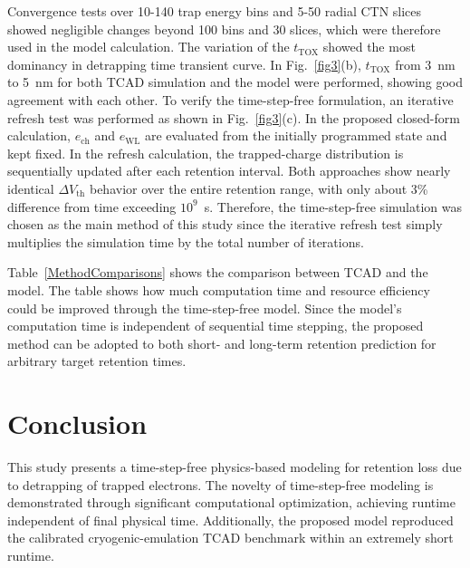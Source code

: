 \documentclass[journal,twoside,web]{ieeecolor}
\begin{document}
{Convergence tests over 10-140 trap energy bins and 5-50 radial CTN slices showed negligible changes beyond 100 bins and 30 slices, which were therefore used in the model calculation.}
The variation of the $t_\text{TOX}$ showed the most dominancy in detrapping time transient curve.
In Fig.~\ref{fig3}(b), $t_\text{TOX}$ from 3~nm to 5~nm for both TCAD simulation and the model were performed, showing good {agreement} with each other.
{To verify the time-step-free formulation, an iterative refresh test was performed as shown in Fig.~\hbox{\ref{fig3}(c)}.}
{In the proposed closed-form calculation, $e_\mathrm{ch}$ and $e_\mathrm{WL}$ are evaluated from the initially programmed state and kept fixed.}
{In the refresh calculation, the trapped-charge distribution is sequentially updated after each retention interval.}
{Both approaches show nearly identical $\Delta V_\text{th}$ behavior over the entire retention range, with only about 3\% difference from time exceeding $10^9$~s.}
{Therefore, the time-step-free simulation was chosen as the main method of this study since the iterative refresh test simply multiplies the simulation time by the total number of iterations.}

Table~\ref{MethodComparisons} shows the comparison between TCAD and the model.
The table shows how much computation time and resource efficiency could be improved through the time-step-free model.
Since the model's computation time is independent {of} sequential time {stepping, the proposed method} can be adopted to both short- and long-term retention {prediction for arbitrary target retention times}.

\section{Conclusion}
This study presents a time-step-free physics-based modeling for retention loss due to detrapping of trapped electrons. 
The novelty of time-step-free modeling is demonstrated through significant computational optimization, achieving runtime independent of final physical time.
Additionally, {the proposed model reproduced the calibrated cryogenic-emulation TCAD benchmark within an extremely short runtime}. 
\end{document}
